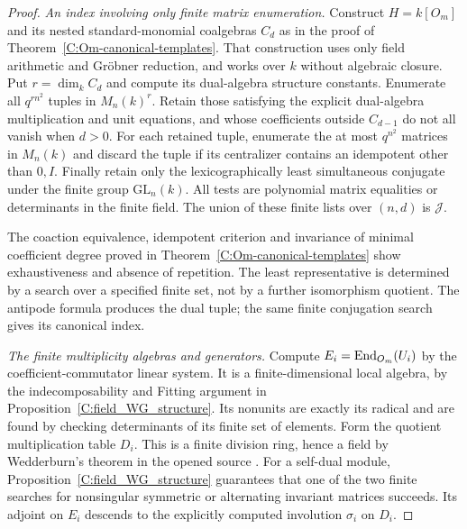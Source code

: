 \begin{proof}
\emph{An index involving only finite matrix enumeration.}
Construct $H=k[O_m]$ and its nested standard-monomial coalgebras $C_d$
as in the proof of Theorem~\ref{C:Om-canonical-templates}. That construction
uses only field arithmetic and Gr\"obner reduction, and works over $k$
without algebraic closure. Put $r=\dim_k C_d$ and compute its dual-algebra
structure constants. Enumerate all $q^{rn^2}$ tuples in $M_n(k)^r$.
Retain those satisfying the explicit dual-algebra multiplication and unit
equations, and whose coefficients outside $C_{d-1}$ do not all vanish
when $d>0$. For each retained tuple, enumerate the at most $q^{n^2}$
matrices in $M_n(k)$ and discard the tuple if its centralizer contains
an idempotent other than $0,I$. Finally retain only the lexicographically
least simultaneous conjugate under the finite group $\mathrm{GL}_n(k)$.
All tests are polynomial matrix equalities or determinants in the finite
field. The union of these finite lists over $(n,d)$ is $\mathscr J$.

The coaction equivalence, idempotent criterion and invariance of minimal
coefficient degree proved in Theorem~\ref{C:Om-canonical-templates}
show exhaustiveness and absence of repetition. The least representative
is determined by a search over a specified finite set, not by a further
isomorphism quotient. The antipode formula produces the dual tuple;
the same finite conjugation search gives its canonical index.

\emph{The finite multiplicity algebras and generators.}
Compute $E_i=\operatorname{End}_{O_m}(U_i)$ by the coefficient-commutator linear system.
It is a finite-dimensional local algebra, by the indecomposability and
Fitting argument in Proposition~\ref{C:field_WG_structure}. Its nonunits
are exactly its radical and are found by checking determinants of its
finite set of elements. Form the quotient multiplication table $D_i$.
This is a finite division ring, hence a field by Wedderburn's theorem
in the opened source \cite[Theorem III.4.4, p.29]{C-ArtinFiniteDivision}.
For a self-dual module, Proposition~\ref{C:field_WG_structure} guarantees
that one of the two finite searches for nonsingular symmetric or
alternating invariant matrices succeeds. Its adjoint on $E_i$ descends
to the explicitly computed involution $\sigma_i$ on $D_i$.


\end{proof}
